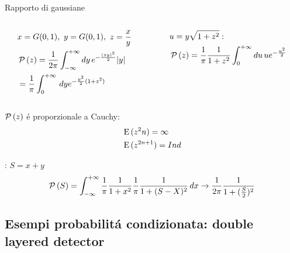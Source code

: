 \documentclass[asd-beamer.tex]{subfiles}
\begin{document}
\begin{wordonframe}{Rapporto di gaussiane}
	\begin{columns}[T]
		\begin{column}{0.5\textwidth}
			\begin{align*}
			&x=G{(0,1)},\ y=G{(0,1)},\ z=\frac{x}{y}\\
			&\operatorname{\mathcal{P}}{(z)}=\frac{1}{2\pi}\int_{-\infty}^{+\infty}{}dy\,e^{-\frac{(zy)^2}{2}}|y|\\
			&=\frac{1}{\pi}\int_{0}^{+\infty}{}\,dye^{-\frac{y^2}{2}(1+z^2)}
			\end{align*}
		\end{column}
		\begin{column}{0.5\textwidth}
			\begin{align*}
			&u=y\sqrt{1+z^2}:\\
			&\operatorname{\mathcal{P}}{(z)}=\frac{1}{\pi}\frac{1}{1+z^2}\int_{0}^{+\infty}{}du\,ue^{-\frac{u^2}{2}}
			\end{align*}
		\end{column}
	\end{columns}
	$\operatorname{\mathcal{P}}{(z)}$ \'e proporzionale a Cauchy:
	\begin{align*}
	&\operatorname{E}{(z^2n)}=\infty\\
	&\operatorname{E}{(z^{2n+1})}=Ind
	\end{align*}
	\begin{block}{: $S=x+y$}
		\[\operatorname{\mathcal{P}}{(S)}=\int_{-\infty}^{+\infty}\frac{1}{\pi}\frac{1}{1+x^2}\frac{1}{\pi}\frac{1}{1+(S-X)^2}\,dx\to\frac{1}{2\pi}\frac{1}{1+(\frac{S}{2})^2}\]
	\end{block}
\end{wordonframe}

\subsection{Esempi probabilit\'a condizionata: double layered detector}
	
\end{document}
